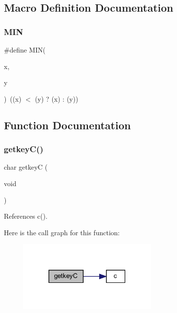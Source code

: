 \subsection{Macro Definition Documentation}
\mbox{\label{C-M__system_8c_a74e75242132eaabbc1c512488a135926}} 
\subsubsection{\texorpdfstring{M\+IN}{MIN}}
{\footnotesize\ttfamily \#define M\+IN(\begin{DoxyParamCaption}\item[{}]{x,  }\item[{}]{y }\end{DoxyParamCaption})~((x) $<$ (y) ? (x) \+: (y))}



\subsection{Function Documentation}
\mbox{\label{C-M__system_8c_a00682f21b3d8ff5bbe69bf47e00f60ab}} 
\subsubsection{\texorpdfstring{getkey\+C()}{getkeyC()}}
{\footnotesize\ttfamily char getkeyC (\begin{DoxyParamCaption}\item[{void}]{ }\end{DoxyParamCaption})}



References c().

Here is the call graph for this function\+:
\nopagebreak
\begin{figure}[H]
\begin{center}
\leavevmode
\includegraphics[width=198pt]{C-M__system_8c_a00682f21b3d8ff5bbe69bf47e00f60ab_cgraph}
\end{center}
\end{figure}
\mbox{\label{C-M__system_8c_acfa12de4342c03519fc35d7892db94b2}} 
